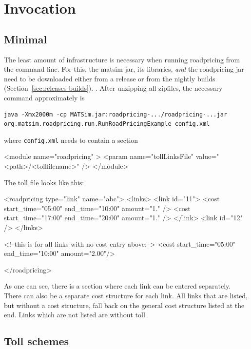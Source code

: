 \section{Invocation}

\subsection{Minimal}

The least amount of infrastructure is necessary when running roadpricing from the command line.  For this, the \acrshort{matsim} jar, its libraries, \emph{and} the roadpricing jar need to be downloaded either from a release or from the nightly builds (Section~\ref{sec:releases-builds}).  . After unzipping all zipfiles, the necessary command approximately is
\begin{lstlisting}
java -Xmx2000m -cp MATSim.jar:roadpricing-.../roadpricing-...jar org.matsim.roadpricing.run.RunRoadPricingExample config.xml  
\end{lstlisting}
where \lstinline$config.xml$ needs to contain a section
\begin{xml}
	<module name="roadpricing" >
		<param name="tollLinksFile" value="<path>/<tollfilename>" />
	</module>
\end{xml}
The toll file looks like this:
\begin{xml}
<roadpricing type="link" name="abc">
   <links>
      <link id="11">
         <cost start_time="05:00" end_time="10:00" amount="1." />
         <cost start_time="17:00" end_time="20:00" amount="1." />
      </link>             
      <link id="12" />
   </links>

   <!--this is for all links with no cost entry above:-->
   <cost start_time="05:00" end_time="10:00" amount="2.00"/>

</roadpricing>
\end{xml}
As one can see, there is a section where each link can be entered separately.  There can also be a separate cost structure for each link.  All links that are listed, but without a cost structure, fall back on the general cost structure listed at the end.  Links which are not listed are without toll.

\subsection{Toll schemes}

